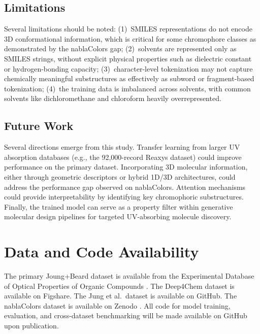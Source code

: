 \documentclass[11pt,a4paper]{article}
\begin{document}
\subsection*{Limitations}

Several limitations should be noted: (1)~SMILES representations do not encode 3D conformational information, which is critical for some chromophore classes as demonstrated by the nablaColors gap; (2)~solvents are represented only as SMILES strings, without explicit physical properties such as dielectric constant or hydrogen-bonding capacity; (3)~character-level tokenization may not capture chemically meaningful substructures as effectively as subword or fragment-based tokenization; (4)~the training data is imbalanced across solvents, with common solvents like dichloromethane and chloroform heavily overrepresented.

\subsection*{Future Work}

Several directions emerge from this study. Transfer learning from larger UV absorption databases (e.g., the 92,000-record Reaxys dataset) could improve performance on the primary dataset. Incorporating 3D molecular information, either through geometric descriptors or hybrid 1D/3D architectures, could address the performance gap observed on nablaColors. Attention mechanisms could provide interpretability by identifying key chromophoric substructures. Finally, the trained model can serve as a property filter within generative molecular design pipelines for targeted UV-absorbing molecule discovery.


\section*{Data and Code Availability}
The primary Joung+Beard dataset is available from the Experimental Database of Optical Properties of Organic Compounds \cite{joungExperimentalDatabaseOptical2020}. The Deep4Chem dataset is available on Figshare. The Jung et al.\ dataset is available on GitHub. The nablaColors dataset is available on Zenodo \cite{potapov2026nablacolors}. All code for model training, evaluation, and cross-dataset benchmarking will be made available on GitHub upon publication.




\end{document}
